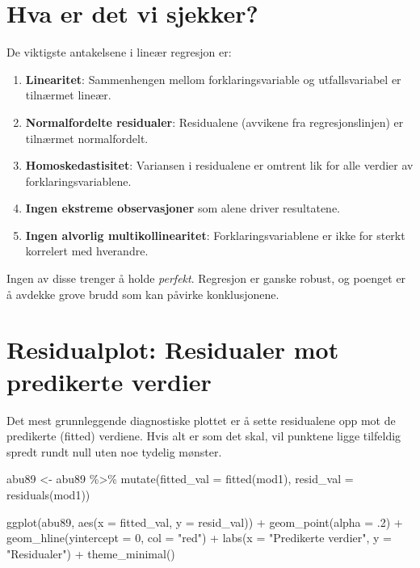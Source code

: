 \documentclass[
  norsk,
  letterpaper,
  DIV=11,
  numbers=noendperiod]{scrreprt}
\newenvironment{Shaded}{\begin{snugshade}}{\end{snugshade}}
\newcommand{\AttributeTok}[1]{\textcolor[rgb]{0.40,0.45,0.13}{#1}}
\newcommand{\DecValTok}[1]{\textcolor[rgb]{0.68,0.00,0.00}{#1}}
\newcommand{\FunctionTok}[1]{\textcolor[rgb]{0.28,0.35,0.67}{#1}}
\newcommand{\NormalTok}[1]{\textcolor[rgb]{0.00,0.23,0.31}{#1}}
\newcommand{\OtherTok}[1]{\textcolor[rgb]{0.00,0.23,0.31}{#1}}
\newcommand{\SpecialCharTok}[1]{\textcolor[rgb]{0.37,0.37,0.37}{#1}}
\newcommand{\StringTok}[1]{\textcolor[rgb]{0.13,0.47,0.30}{#1}}
\providecommand{\tightlist}{%
  \setlength{\itemsep}{0pt}\setlength{\parskip}{0pt}}
\theoremstyle{definition}
\theoremstyle{remark}
\begin{document}
\section{Hva er det vi sjekker?}\label{hva-er-det-vi-sjekker}

De viktigste antakelsene i lineær regresjon er:

\begin{enumerate}
\def\labelenumi{\arabic{enumi}.}
\tightlist
\item
  \textbf{Linearitet}: Sammenhengen mellom forklaringsvariable og
  utfallsvariabel er tilnærmet lineær.
\item
  \textbf{Normalfordelte residualer}: Residualene (avvikene fra
  regresjonslinjen) er tilnærmet normalfordelt.
\item
  \textbf{Homoskedastisitet}: Variansen i residualene er omtrent lik for
  alle verdier av forklaringsvariablene.
\item
  \textbf{Ingen ekstreme observasjoner} som alene driver resultatene.
\item
  \textbf{Ingen alvorlig multikollinearitet}: Forklaringsvariablene er
  ikke for sterkt korrelert med hverandre.
\end{enumerate}

Ingen av disse trenger å holde \emph{perfekt}. Regresjon er ganske
robust, og poenget er å avdekke grove brudd som kan påvirke
konklusjonene.

\section{Residualplot: Residualer mot predikerte
verdier}\label{residualplot-residualer-mot-predikerte-verdier}

Det mest grunnleggende diagnostiske plottet er å sette residualene opp
mot de predikerte (fitted) verdiene. Hvis alt er som det skal, vil
punktene ligge tilfeldig spredt rundt null uten noe tydelig mønster.

\begin{Shaded}
\begin{Highlighting}[]
\NormalTok{abu89 }\OtherTok{\textless{}{-}}\NormalTok{ abu89 }\SpecialCharTok{\%\textgreater{}\%}
  \FunctionTok{mutate}\NormalTok{(}\AttributeTok{fitted\_val =} \FunctionTok{fitted}\NormalTok{(mod1),}
         \AttributeTok{resid\_val  =} \FunctionTok{residuals}\NormalTok{(mod1))}

\FunctionTok{ggplot}\NormalTok{(abu89, }\FunctionTok{aes}\NormalTok{(}\AttributeTok{x =}\NormalTok{ fitted\_val, }\AttributeTok{y =}\NormalTok{ resid\_val)) }\SpecialCharTok{+}
  \FunctionTok{geom\_point}\NormalTok{(}\AttributeTok{alpha =}\NormalTok{ .}\DecValTok{2}\NormalTok{) }\SpecialCharTok{+}
  \FunctionTok{geom\_hline}\NormalTok{(}\AttributeTok{yintercept =} \DecValTok{0}\NormalTok{, }\AttributeTok{col =} \StringTok{"red"}\NormalTok{) }\SpecialCharTok{+}
  \FunctionTok{labs}\NormalTok{(}\AttributeTok{x =} \StringTok{"Predikerte verdier"}\NormalTok{, }\AttributeTok{y =} \StringTok{"Residualer"}\NormalTok{) }\SpecialCharTok{+}
  \FunctionTok{theme\_minimal}\NormalTok{()}
\end{Highlighting}
\end{Shaded}
\end{document}
